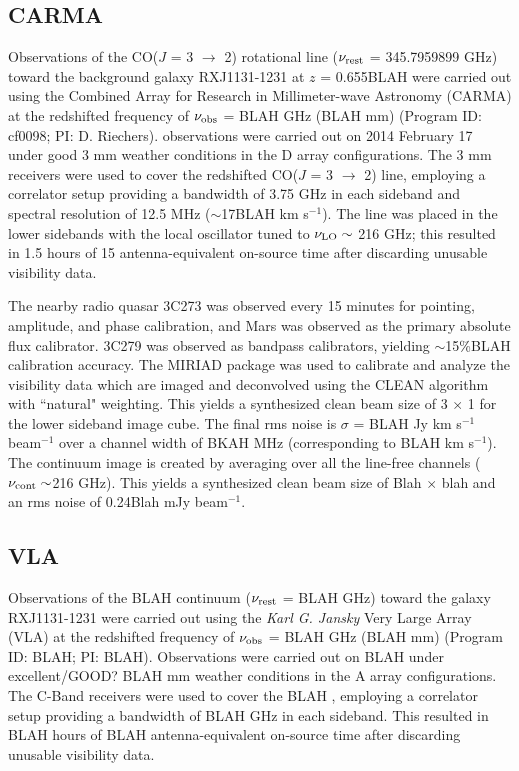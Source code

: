 \documentclass[]{emulateapj}
\begin{document}
\subsection{CARMA} \label{sec:carmadata}
%
Observations of the CO($J$ = 3 $\rightarrow$ 2) rotational line ($\nu_{\rm
rest}$ = 345.7959899 GHz) toward the background galaxy RXJ1131-1231 at $z$ = 
0.655BLAH 
 were carried out using the Combined Array for Research in Millimeter-wave
Astronomy (CARMA) at the redshifted frequency of $\nu_{\rm obs}$ = BLAH GHz
(BLAH 
mm) (Program ID: cf0098; PI: D. Riechers).
observations were carried out on 2014 February 17 under good 3 mm weather
conditions in the D array configurations. The 3 mm receivers were used to cover
the 
redshifted CO($J$ = 3 $\rightarrow$ 2) line, employing a correlator setup
providing a bandwidth of 3.75 GHz in each sideband and spectral resolution of
12.5 MHz ($
\sim$17BLAH km s$^{-1}$). The line was placed in the
lower sidebands with the local oscillator tuned to $\nu_{\rm LO}\sim$ 216 GHz;
this resulted in 1.5 hours of 15 antenna-equivalent on-source time after
discarding 
unusable visibility data. 

The nearby radio quasar 3C273 was observed every 15 minutes for
pointing, amplitude, and phase calibration, and Mars was observed as the
primary
absolute flux calibrator. 3C279 was observed as bandpass calibrators, yielding
$\sim
$15\%BLAH calibration accuracy.
The MIRIAD package was used to calibrate and analyze the visibility data which
are imaged and deconvolved using
the CLEAN algorithm with ``natural" weighting. This yields a synthesized clean
beam size of 3 $\times$ 1 for the lower sideband image cube. The
final 
rms noise is $\sigma$ = BLAH Jy km s$^{-1}$ beam$^{-1}$ over a channel width of
BKAH MHz (corresponding to BLAH km s$^{-1}$). 
The continuum image is created by
averaging over all the line-free channels ($\nu_{\rm cont}\sim$216 GHz). This
yields a synthesized clean beam size of Blah $\times$ blah and an
rms 
noise of 0.24Blah mJy beam$^{-1}$.

\subsection{VLA} 
Observations of the BLAH continuum ($\nu_{\rm rest}$ = BLAH GHz) toward the
galaxy RXJ1131-1231 were carried out using the {\it Karl G. Jansky} Very Large 
Array (VLA) at the redshifted frequency of $\nu_{\rm obs}$ = BLAH GHz (BLAH mm)
(Program ID: BLAH; PI: BLAH).
Observations were carried out on BLAH under excellent/GOOD? BLAH mm weather
conditions in the A array configurations. The C-Band receivers were used to 
cover the BLAH
, employing a correlator setup providing a bandwidth of BLAH GHz in each
sideband. This resulted in BLAH hours of BLAH antenna-equivalent on-source time
after 
discarding unusable visibility data.
\end{document}
